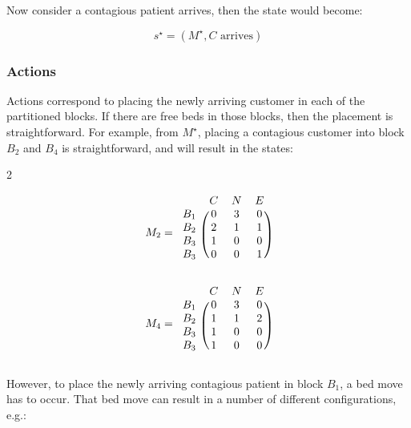 \documentclass{article}
\begin{document}
Now consider a contagious patient arrives, then the state would become:

\begin{equation*}
s^{\star} = (M^{\star}, C \text{ arrives})
\end{equation*}

\subsubsection*{Actions}
Actions correspond to placing the newly arriving customer in each of the partitioned blocks.
If there are free beds in those blocks, then the placement is straightforward.
For example, from $M^{\star}$, placing a contagious customer into block $B_2$ and $B_4$ is straightforward, and will result in the states:

\begin{multicols}{2}

\begin{equation*}
M_2 = \begin{blockarray}{cccc}
& C & N & E \\
\begin{block}{c(ccc)}
B_1 & 0 & 3 & 0 \\
B_2 & 2 & 1 & 1 \\
B_3 & 1 & 0 & 0 \\
B_3 & 0 & 0 & 1 \\
\end{block}
\end{blockarray}
\end{equation*}

\begin{equation*}
M_4 = \begin{blockarray}{cccc}
& C & N & E \\
\begin{block}{c(ccc)}
B_1 & 0 & 3 & 0 \\
B_2 & 1 & 1 & 2 \\
B_3 & 1 & 0 & 0 \\
B_3 & 1 & 0 & 0 \\
\end{block}
\end{blockarray}
\end{equation*}

\end{multicols}

However, to place the newly arriving contagious patient in block $B_1$, a bed move has to occur.
That bed move can result in a number of different configurations, e.g.:
\end{document}
